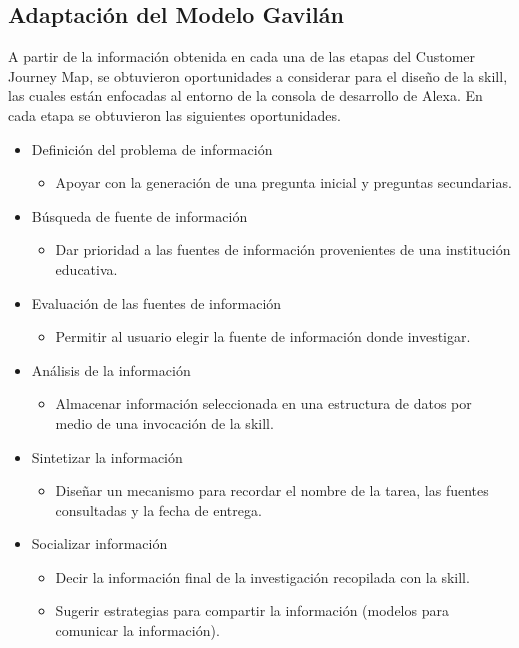 \subsection{Adaptación del Modelo Gavilán}
\label{AdaptacionModeloGavilancapIV}

A partir de la información obtenida en cada una de las etapas del Customer Journey Map, se obtuvieron oportunidades a considerar para el diseño de la skill, las cuales están enfocadas al entorno de la consola de desarrollo de Alexa. En cada etapa se obtuvieron las siguientes oportunidades.

\begin{itemize}
  \item Definición del problema de información
  \begin{itemize}
    \item Apoyar con la generación de una pregunta inicial y preguntas secundarias.
  \end{itemize}
  \item Búsqueda de fuente de información
  \begin{itemize}
    \item Dar prioridad a las fuentes de información provenientes de una institución educativa.
  \end{itemize}
  \item Evaluación de las fuentes de información
  \begin{itemize}
    \item Permitir al usuario elegir la fuente de información donde investigar.
  \end{itemize}
  \item Análisis de la información
  \begin{itemize}
    \item Almacenar información seleccionada en una estructura de datos por medio de una invocación de la skill.
  \end{itemize}
  \item Sintetizar la información
  \begin{itemize}
    \item Diseñar un mecanismo para recordar el nombre de la tarea, las fuentes consultadas y la fecha de entrega.
  \end{itemize}
  \item Socializar información
  \begin{itemize}
    \item Decir la información final de la investigación recopilada con la skill.
    \item Sugerir estrategias para compartir la información (modelos para comunicar la información).
  \end{itemize}
\end{itemize}

